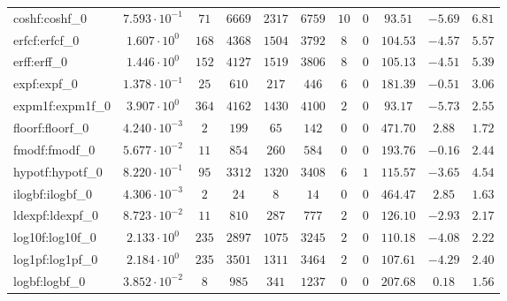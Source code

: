 \begin{tabular}{|l|c|c|c|c|c|c|c|c|c|c|}
coshf:coshf\_0               & $ 7.593 \cdot 10^{-1} $ & $ 71     $ & $ 6669   $ & $ 2317  $ & $ 6759   $ & $ 10  $ & $ 0 $ & $ 93.51       $ & $ -5.69   $ & $ 6.81    $ \\
erfcf:erfcf\_0               & $ 1.607 \cdot 10^{0}  $ & $ 168    $ & $ 4368   $ & $ 1504  $ & $ 3792   $ & $ 8   $ & $ 0 $ & $ 104.53      $ & $ -4.57   $ & $ 5.57    $ \\
erff:erff\_0                 & $ 1.446 \cdot 10^{0}  $ & $ 152    $ & $ 4127   $ & $ 1519  $ & $ 3806   $ & $ 8   $ & $ 0 $ & $ 105.13      $ & $ -4.51   $ & $ 5.39    $ \\
expf:expf\_0                 & $ 1.378 \cdot 10^{-1} $ & $ 25     $ & $ 610    $ & $ 217   $ & $ 446    $ & $ 6   $ & $ 0 $ & $ 181.39      $ & $ -0.51   $ & $ 3.06    $ \\
expm1f:expm1f\_0             & $ 3.907 \cdot 10^{0}  $ & $ 364    $ & $ 4162   $ & $ 1430  $ & $ 4100   $ & $ 2   $ & $ 0 $ & $ 93.17       $ & $ -5.73   $ & $ 2.55    $ \\
floorf:floorf\_0             & $ 4.240 \cdot 10^{-3} $ & $ 2      $ & $ 199    $ & $ 65    $ & $ 142    $ & $ 0   $ & $ 0 $ & $ 471.70      $ & $ 2.88    $ & $ 1.72    $ \\
fmodf:fmodf\_0               & $ 5.677 \cdot 10^{-2} $ & $ 11     $ & $ 854    $ & $ 260   $ & $ 584    $ & $ 0   $ & $ 0 $ & $ 193.76      $ & $ -0.16   $ & $ 2.44    $ \\
hypotf:hypotf\_0             & $ 8.220 \cdot 10^{-1} $ & $ 95     $ & $ 3312   $ & $ 1320  $ & $ 3408   $ & $ 6   $ & $ 1 $ & $ 115.57      $ & $ -3.65   $ & $ 4.54    $ \\
ilogbf:ilogbf\_0             & $ 4.306 \cdot 10^{-3} $ & $ 2      $ & $ 24     $ & $ 8     $ & $ 14     $ & $ 0   $ & $ 0 $ & $ 464.47      $ & $ 2.85    $ & $ 1.63    $ \\
ldexpf:ldexpf\_0             & $ 8.723 \cdot 10^{-2} $ & $ 11     $ & $ 810    $ & $ 287   $ & $ 777    $ & $ 2   $ & $ 0 $ & $ 126.10      $ & $ -2.93   $ & $ 2.17    $ \\
log10f:log10f\_0             & $ 2.133 \cdot 10^{0}  $ & $ 235    $ & $ 2897   $ & $ 1075  $ & $ 3245   $ & $ 2   $ & $ 0 $ & $ 110.18      $ & $ -4.08   $ & $ 2.22    $ \\
log1pf:log1pf\_0             & $ 2.184 \cdot 10^{0}  $ & $ 235    $ & $ 3501   $ & $ 1311  $ & $ 3464   $ & $ 2   $ & $ 0 $ & $ 107.61      $ & $ -4.29   $ & $ 2.40    $ \\
logbf:logbf\_0               & $ 3.852 \cdot 10^{-2} $ & $ 8      $ & $ 985    $ & $ 341   $ & $ 1237   $ & $ 0   $ & $ 0 $ & $ 207.68      $ & $ 0.18    $ & $ 1.56    $ \\

\end{tabular}
